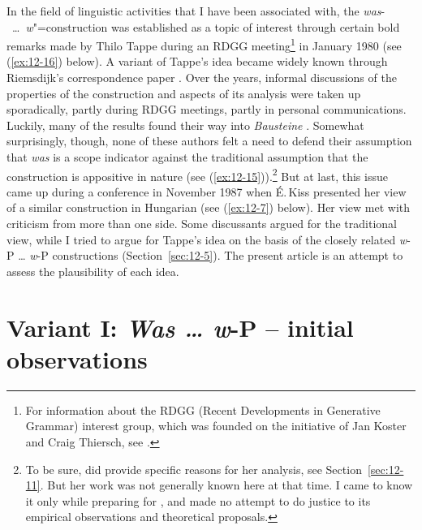 \documentclass[output=paper]{langsci/langscibook}
\begin{document}
In the field of linguistic activities that I have been associated
with, the \textit{was}-~\ldots{}~\textit{w}"=construction was established as a topic of
interest through certain bold remarks made by Thilo Tappe during an
RDGG meeting\footnote{%
	For information about the RDGG (Recent
  Developments in Generative Grammar) interest group, which was
  founded on the initiative of Jan Koster and Craig Thiersch, see
  \citet[ix]{Toman1985Preface}.%
}
in January 1980 (see (\ref{ex:12-16}) below). A variant of
Tappe's idea became widely known through Riemsdijk's correspondence
paper \citep{Riemsdijk1982}. Over the years, informal discussions of the
properties of the construction and aspects of its analysis were taken
up sporadically, partly during RDGG meetings, partly in personal
communications. Luckily, many of the results found their way into \textit{Bausteine} \citep[354ff., 374f., 384f., 393, 400]{Stechow1988}.  Somewhat surprisingly, though, none of these authors felt a
need to defend their assumption that \textit{was} is a scope indicator
against the traditional assumption that the construction is appositive
in nature (see (\ref{ex:12-15})).\footnote{%
	To be sure, \citet{McDaniel1986} did provide
  specific reasons for her analysis, see Section~\ref{sec:12-11}. But her work was
  not generally known here at that time. I came to know it only while
  preparing for \citet{Hoehle1989a}, and made no attempt to do justice to
  its empirical observations and
  theoretical proposals.%
}
But at last, this issue came up during a conference in November 1987 when \'E.\,Kiss presented her view of a similar construction in Hungarian (see (\ref{ex:12-7}) below). Her view met with criticism from more than one side. Some discussants argued for the traditional
view, while I tried to argue for Tappe's idea on the basis of the closely related \textit{w}-P \ldots{} \textit{w}-P constructions (Section~\ref{sec:12-5}). The present article is an attempt to assess the plausibility of each idea.

\section{Variant I: \textit{Was  \ldots{}  w}-P  --  initial observations}
\label{sec:12-2}
\end{document}
